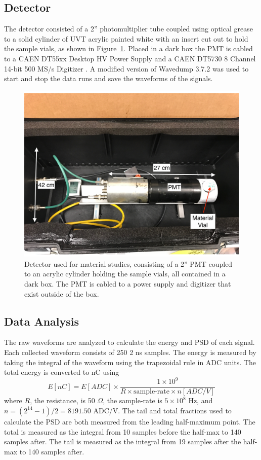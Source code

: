 \subsection{Detector}

The detector consisted of a 2'' photomultiplier tube coupled using optical grease to a solid cylinder of UVT acrylic painted white with an insert cut out to hold the sample vials, as shown in Figure~\ref{fig:blackbox}.
Placed in a dark box the PMT is cabled to a CAEN DT55xx Desktop HV Power Supply and a CAEN DT5730 8 Channel 14-bit 500 MS/s Digitizer \cite{CAENDigit}.
A modified version of Wavedump 3.7.2 \cite{CAENWD} was used to start and stop the data runs and save the waveforms of the signals.

\begin{figure}[H]
	\centering
	\includegraphics[width=0.7\linewidth]{tex/6-ac227-images/BNL/BlackBox}
	\caption[Detector used for material adsorption studies]{Detector used for material studies, consisting of a 2'' PMT coupled to an acrylic cylinder holding the sample vials, all contained in a dark box. The PMT is cabled to a power supply and digitizer that exist outside of the box.}
	\label{fig:blackbox}
\end{figure}

\subsection{Data Analysis}

The raw waveforms are analyzed to calculate the energy and PSD of each signal. 
Each collected waveform consists of 250 2 ns samples.
The energy is measured by taking the integral of the waveform using the trapezoidal rule in ADC units.
The total energy is converted to nC using
\begin{equation}
E[nC] = E[ADC] \times \frac{1\times10^9}{R\times\textrm{sample-rate}\times n[ADC/V]}
\end{equation}
where $R$, the resistance, is 50 $\Omega$, the sample-rate is $5\times10^8$ Hz, and $n = (2^{14} -1)/2 = 8191.50$ ADC/V.
The tail and total fractions used to calculate the PSD are both measured from the leading half-maximum point.
The total is measured as the integral from 10 samples before the half-max to 140 samples after.
The tail is measured as the integral from 19 samples after the half-max to 140 samples after.


